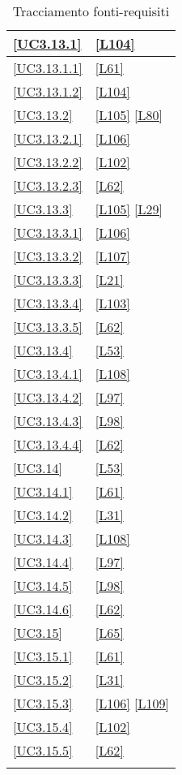 \begin{longtable}{|P{6cm}|P{6cm}|}
	\hline \ref{UC3.13.1} & \ref{L104} \\
	\hline \ref{UC3.13.1.1} & \ref{L61} \\
	\hline \ref{UC3.13.1.2} & \ref{L104} \\
	\hline \ref{UC3.13.2} & \ref{L105} \linebreak \ref{L80} \\
	\hline \ref{UC3.13.2.1} & \ref{L106} \\
	\hline \ref{UC3.13.2.2} & \ref{L102} \\
	\hline \ref{UC3.13.2.3} & \ref{L62} \\
	\hline \ref{UC3.13.3} & \ref{L105} \linebreak \ref{L29} \\
	\hline \ref{UC3.13.3.1} & \ref{L106} \\
	\hline \ref{UC3.13.3.2} & \ref{L107} \\
	\hline \ref{UC3.13.3.3} & \ref{L21} \\
	\hline \ref{UC3.13.3.4} & \ref{L103} \\
	\hline \ref{UC3.13.3.5} & \ref{L62} \\
	\hline \ref{UC3.13.4} & \ref{L53} \\
	\hline \ref{UC3.13.4.1} & \ref{L108} \\
	\hline \ref{UC3.13.4.2} & \ref{L97} \\
	\hline \ref{UC3.13.4.3} & \ref{L98} \\
	\hline \ref{UC3.13.4.4} & \ref{L62} \\
	\hline \ref{UC3.14} & \ref{L53} \\
	\hline \ref{UC3.14.1} & \ref{L61} \\
	\hline \ref{UC3.14.2} & \ref{L31} \\
	\hline \ref{UC3.14.3} & \ref{L108} \\
	\hline \ref{UC3.14.4} & \ref{L97} \\
	\hline \ref{UC3.14.5} & \ref{L98} \\
	\hline \ref{UC3.14.6} & \ref{L62} \\
	\hline \ref{UC3.15} & \ref{L65} \\
	\hline \ref{UC3.15.1} & \ref{L61} \\
	\hline \ref{UC3.15.2} & \ref{L31} \\
	\hline \ref{UC3.15.3} & \ref{L106} \linebreak \ref{L109} \\
	\hline \ref{UC3.15.4} & \ref{L102} \\
	\hline \ref{UC3.15.5} & \ref{L62} \\
	\hline
	\caption{Tracciamento fonti-requisiti}
\end{longtable}

